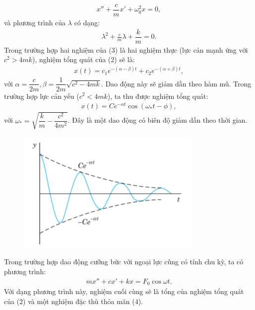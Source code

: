 \begin{multicols}{2}
\begin{align*}
		x'' + \dfrac{c}{m}x' + \omega_0^2x = 0, \tag{$2$}
	\end{align*}
	và phương trình của $\lambda$ có dạng:
	\begin{align*}
		\lambda^2 + \frac{c}{m} \lambda + \dfrac{k}{m} = 0. \tag{$3$}
	\end{align*}
	Trong trường hợp hai nghiệm của ($3$) là hai nghiệm thực (lực cản mạnh ứng với $c^2>4mk$), nghiệm tổng quát của ($2$) sẽ là:
	\begin{align*}
		x(t) = c_1e^{-(\alpha-\beta)t}+ c_2e^{-(\alpha + \beta)t},
	\end{align*}
	với $\alpha = \dfrac{c}{2m}, \beta = \dfrac{1}{2m}\sqrt{c^2 - 4mk}$.
	\vskip 0.1cm
	Dao động này sẽ giảm dần theo hàm mũ.
	\vskip 0.1cm
	Trong trường hợp lực cản yếu ($c^2<4mk$), ta thu được nghiệm tổng quát:
	\begin{align*}
		x(t) = Ce^{-\alpha t}\cos(\omega_*t - \phi),
	\end{align*}
	với $\omega_* = \sqrt{\dfrac{k}{m} - \dfrac{c^2}{4m^2}}$.
	\vskip 0.1cm
	Đây là một dao động có biên độ giảm dần theo thời gian.
	\begin{figure}[H]
		\centering
		\vspace*{-5pt}
		\captionsetup{labelformat= empty, justification=centering}
		\includegraphics[width=1\linewidth]{12}
		\vspace*{-15pt}
	\end{figure}
	Trong trường hợp dao động cưỡng bức với ngoại lực cũng có tính chu kỳ, ta có phương trình:
	\begin{align*}
		mx'' + cx' + kx = F_0\cos \omega t. \tag{$4$}
	\end{align*}
	Với dạng phương trình này, nghiệm cuối cùng sẽ là tổng của nghiệm tổng quát của ($2$) và một nghiệm đặc thù thỏa mãn ($4$).

\end{multicols}

